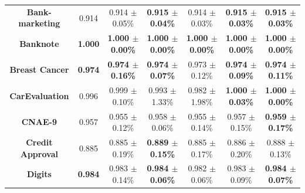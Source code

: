 \documentclass[iicol]{sn-jnl}
\theoremstyle{thmstyleone}%
\theoremstyle{thmstyletwo}%
\theoremstyle{thmstylethree}%
\begin{document}
\begin{table}
{\begin{tabular}{ccccccc}
\textbf{Bank-marketing}         & 0.914                                 & 0.914 $\pm$ 0.05\%                                 & \textbf{0.915 $\pm$ 0.04\%}                        & 0.914 $\pm$ 0.03\%                                 & {\color[HTML]{FE0000} \textbf{0.915 $\pm$ 0.03\%}} & {\color[HTML]{FE0000} \textbf{0.915 $\pm$ 0.03\%}} \\
\textbf{Banknote}               & {\color[HTML]{FE0000} \textbf{1.000}} & {\color[HTML]{FE0000} \textbf{1.000 $\pm$ 0.00\%}} & {\color[HTML]{FE0000} \textbf{1.000 $\pm$ 0.00\%}} & {\color[HTML]{FE0000} \textbf{1.000 $\pm$ 0.00\%}} & {\color[HTML]{FE0000} \textbf{1.000 $\pm$ 0.00\%}} & {\color[HTML]{FE0000} \textbf{1.000 $\pm$ 0.00\%}} \\
\textbf{Breast Cancer}          & {\color[HTML]{FE0000} \textbf{0.974}} & \textbf{0.974 $\pm$ 0.16\%}                        & \textbf{0.974 $\pm$ 0.07\%}                        & 0.973 $\pm$ 0.12\%                                 & \textbf{0.974 $\pm$ 0.09\%}                        & \textbf{0.974 $\pm$ 0.11\%}                        \\
\textbf{CarEvaluation}          & 0.996                                 & 0.999 $\pm$ 0.10\%                                 & 0.993 $\pm$ 1.33\%                                 & 0.982 $\pm$ 1.98\%                                 & \textbf{1.000 $\pm$ 0.03\%}                        & {\color[HTML]{FE0000} \textbf{1.000 $\pm$ 0.00\%}} \\
\textbf{CNAE-9}                 & 0.957                                 & 0.955 $\pm$ 0.12\%                                 & 0.958 $\pm$ 0.06\%                                 & 0.955 $\pm$ 0.14\%                                 & 0.957 $\pm$ 0.15\%                                 & {\color[HTML]{FE0000} \textbf{0.959 $\pm$ 0.17\%}} \\
\textbf{Credit   Approval}      & 0.885                                 & 0.885 $\pm$ 0.19\%                                 & {\color[HTML]{FE0000} \textbf{0.889 $\pm$ 0.15\%}} & 0.885 $\pm$ 0.17\%                                 & 0.886 $\pm$ 0.20\%                                 & 0.888 $\pm$ 0.13\%                                 \\
\textbf{Digits}                 & {\color[HTML]{FE0000} \textbf{0.984}} & 0.983 $\pm$ 0.14\%                                 & \textbf{0.984 $\pm$ 0.06\%}                        & 0.982 $\pm$ 0.06\%                                 & 0.983 $\pm$ 0.09\%                                 & \textbf{0.984 $\pm$ 0.07\%}                        \\

\end{tabular}}
\end{table}
\end{document}
